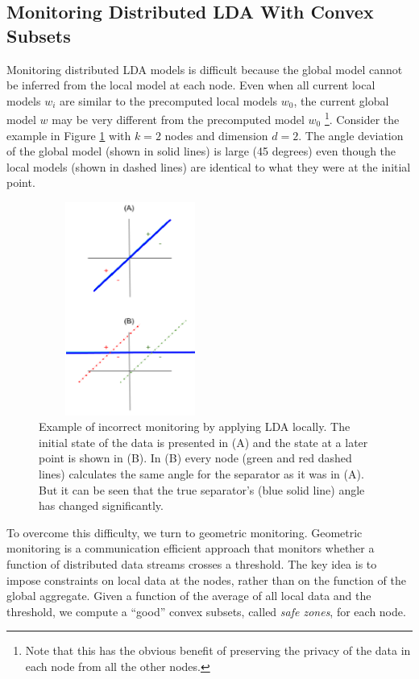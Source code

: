 \subsection{Monitoring Distributed LDA With Convex Subsets}
Monitoring distributed LDA models is difficult because the
global model cannot be inferred from the local model at each
node. Even when all current local models $w_i$ are similar to the precomputed
local models $w_0$, the current global model $w$ may
be very different from the precomputed model $w_0$
\footnote{Note that this has the obvious benefit of preserving the privacy
of the data in each node from all the other nodes.}.
Consider the example in Figure \ref{NegativeExample} with $k = 2$ nodes
and dimension $d =2$.
The angle deviation of the global model (shown in solid lines) is large (45 degrees)
even though the local models (shown in dashed lines) are identical to what they
were at the initial point.

\begin{figure}[h]
\centering
\includegraphics[width=60mm, height=7cm]{NegativeExample.png}
\caption{Example of incorrect monitoring by applying LDA locally. The
initial state of the data is presented in (A) and the state at a later point
is shown in (B). In (B) every node (green and red dashed lines) calculates the same angle
for the separator as it was in (A). But it can be
seen that the true separator's (blue solid line) angle has changed
significantly.}
\label{NegativeExample}
\end{figure}


\par To overcome this difficulty, we turn to geometric monitoring. Geometric
monitoring \cite{keren2014geometric, keren2012shape} is a communication
efficient approach that monitors whether a function of distributed
data streams crosses a threshold. The key idea is to
impose constraints on local data at the nodes, rather than
on the function of the global aggregate. Given a function of
the average of all local data and the threshold, we compute a
``good'' convex subsets, called \textit{safe zones}, for each
node.

